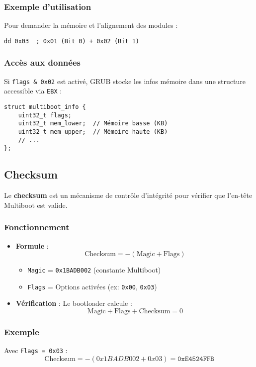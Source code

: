 \documentclass{article}
\begin{document}
\subsubsection*{Exemple d'utilisation}
Pour demander la mémoire et l'alignement des modules :

\begin{verbatim}
dd 0x03  ; 0x01 (Bit 0) + 0x02 (Bit 1)
\end{verbatim}

\subsubsection*{Accès aux données}
Si \texttt{flags \& 0x02} est activé, GRUB stocke les infos mémoire dans une structure accessible via \texttt{EBX} :

\begin{verbatim}
struct multiboot_info {
    uint32_t flags;
    uint32_t mem_lower;  // Mémoire basse (KB)
    uint32_t mem_upper;  // Mémoire haute (KB)
    // ...
};
\end{verbatim}

\subsection*{Checksum}
Le \textbf{checksum} est un mécanisme de contrôle d'intégrité pour vérifier que l'en-tête Multiboot est valide.

\subsubsection*{Fonctionnement}
\begin{itemize}
    \item \textbf{Formule} : 
    \[
    \text{Checksum} = -(\text{Magic} + \text{Flags})
    \]
    \begin{itemize}
        \item \texttt{Magic} = \texttt{0x1BADB002} (constante Multiboot)
        \item \texttt{Flags} = Options activées (ex: \texttt{0x00}, \texttt{0x03})
    \end{itemize}
    
    \item \textbf{Vérification} :
    Le bootloader calcule :
    \[
    \text{Magic} + \text{Flags} + \text{Checksum} = 0
    \]
\end{itemize}

\subsubsection*{Exemple}
Avec \texttt{Flags = 0x03} :
\[
\text{Checksum} = -(0x1BADB002 + 0x03) = \texttt{0xE4524FFB}
\]
\end{document}
